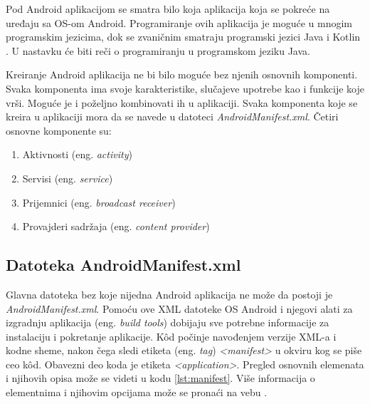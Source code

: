 \documentclass[android.tex]{subfiles}
\begin{document}
Pod Android aplikacijom se smatra bilo koja aplikacija koja se pokreće na uređaju sa OS-om Android. Programiranje ovih aplikacija je moguće u mnogim programskim jezicima, dok se zvaničnim smatraju programski jezici Java i Kotlin \cite{sajt:kotlin}. U nastavku će biti reči o programiranju u programskom jeziku Java.

Kreiranje Android aplikacija ne bi bilo moguće bez njenih osnovnih komponenti. Svaka komponenta ima svoje karakteristike, slučajeve upotrebe kao i funkcije koje vrši. Moguće je i poželjno kombinovati ih u aplikaciji. Svaka komponenta koje se kreira u aplikaciji mora da se navede u datoteci \textit{AndroidManifest.xml}. Četiri osnovne komponente su:

\begin{enumerate}
\item Aktivnosti (eng. \textit{activity})
\item Servisi (eng. \textit{service})
\item Prijemnici (eng. \textit{broadcast receiver})
\item Provajderi sadržaja (eng. \textit{content provider})
\end{enumerate}

\subsection{Datoteka AndroidManifest.xml}
\label{sec:manifest}
Glavna datoteka bez koje nijedna Android aplikacija ne može da postoji je \textit{AndroidManifest.xml}. Pomoću ove XML datoteke OS Android i njegovi alati za izgradnju aplikacija (eng. \textit{build tools}) dobijaju sve potrebne informacije za instalaciju i pokretanje aplikacije. K\^{o}d počinje navođenjem verzije XML-a i kodne sheme, nakon čega sledi etiketa (eng. \textit{tag}) \textit{<manifest>} u okviru kog se piše ceo k\^{o}d. Obavezni deo koda je etiketa \textit{<application>}. Pregled osnovnih elemenata i njihovih opisa može se videti u kodu \ref{lst:manifest}. Više informacija o elementnima i njihovim opcijama može se pronaći na vebu \cite{sajt:manifest}.


\end{document}
